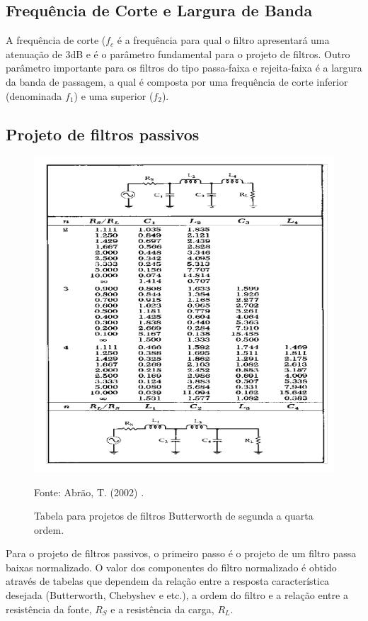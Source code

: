 \subsection{Frequência de Corte e Largura de Banda}
A frequência de corte ($f_c$ é a frequência para qual o filtro apresentará uma atenuação de 3dB e é o parâmetro fundamental para o projeto de filtros.
Outro parâmetro importante para os filtros do tipo passa-faixa e rejeita-faixa 
é a largura da banda de passagem, a qual é composta por uma frequência de corte 
inferior (denominada $f_1$) e uma superior ($f_2$).

\subsection{Projeto de filtros passivos}

\begin{figure}[!ht]
  \centering
  \caption{Tabela para projetos de filtros Butterworth de segunda a quarta 
  ordem.}
  \includegraphics[scale=0.35]{Imagens/tabela.png}
  
  \label{fig:tabela}
  \small Fonte: Abrão, T. (2002) \cite{abrao}.
\end{figure}

Para o projeto de filtros passivos, o primeiro passo é o projeto de um filtro 
passa baixas normalizado. O valor dos componentes do filtro normalizado é 
obtido através de tabelas que dependem da relação entre a resposta 
característica desejada (Butterworth, Chebyshev e etc.), a ordem do filtro e a 
relação entre a resistência da fonte, $R_S$ e a resistência da carga, $R_L$.

